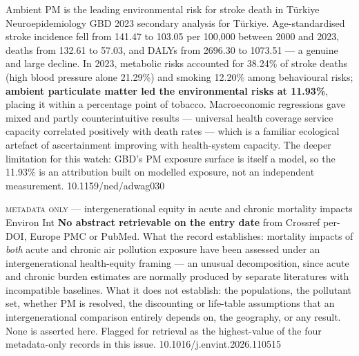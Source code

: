 \documentclass[10pt]{article}
\begin{document}
{Ambient PM is the leading environmental risk for stroke death in Türkiye}
{Neuroepidemiology}
{GBD 2023 secondary analysis for Türkiye. Age-standardised stroke incidence fell from 141.47
to 103.05 per 100{,}000 between 2000 and 2023, deaths from 132.61 to 57.03, and DALYs from
2696.30 to 1073.51 --- a genuine and large decline. In 2023, metabolic risks accounted for
38.24\% of stroke deaths (high blood pressure alone 21.29\%) and smoking 12.20\% among
behavioural risks; \textbf{ambient particulate matter led the environmental risks at
11.93\%}, placing it within a percentage point of tobacco. Macroeconomic regressions gave
mixed and partly counterintuitive results --- universal health coverage service capacity
correlated positively with death rates --- which is a familiar ecological artefact of
ascertainment improving with health-system capacity. The deeper limitation for this watch:
GBD's PM exposure surface is itself a model, so the 11.93\% is an attribution built on
modelled exposure, not an independent measurement.}
{10.1159/ned/adwag030}

{\textsc{metadata only} --- intergenerational equity in acute and chronic mortality impacts}
{Environ Int}
{\textbf{No abstract retrievable on the entry date} from Crossref per-DOI, Europe PMC or
PubMed. What the record establishes: mortality impacts of \emph{both} acute and chronic air
pollution exposure have been assessed under an intergenerational health-equity framing ---
an unusual decomposition, since acute and chronic burden estimates are normally produced by
separate literatures with incompatible baselines. What it does not establish: the
populations, the pollutant set, whether PM is resolved, the discounting or
life-table assumptions that an intergenerational comparison entirely depends on, the
geography, or any result. None is asserted here. Flagged for retrieval as the highest-value
of the four metadata-only records in this issue.}
{10.1016/j.envint.2026.110515}

\end{document}
